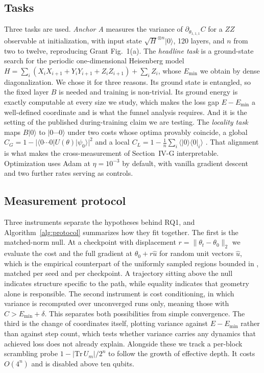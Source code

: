 \documentclass[conference]{IEEEtran}%
\newcommand{\gap}{\ensuremath{E-E_{\min}}}
\begin{document}
\subsection{Tasks}
Three tasks are used. \emph{Anchor A} measures the variance of $\partial_{\theta_{1,1,1}}C$ for a $ZZ$ observable at initialization, with input state $\sqrt{H}^{\otimes n}\lvert0\rangle$, 120 layers, and $n$ from two to twelve, reproducing Grant Fig.~1(a). The \emph{headline task} is a ground-state search for the periodic one-dimensional Heisenberg model $H=\sum_i (X_iX_{i+1}{+}Y_iY_{i+1}{+}Z_iZ_{i+1})+\sum_i Z_i$, whose $E_{\min}$ we obtain by dense diagonalization. We chose it for three reasons. Its ground state is entangled, so the fixed layer $B$ is needed and training is non-trivial. Its ground energy is exactly computable at every size we study, which makes the loss gap \gap{} a well-defined coordinate and is what the funnel analysis requires. And it is the setting of the published during-training claim we are testing. The \emph{locality task} maps $B\lvert0\rangle$ to $\lvert0\cdots0\rangle$ under two costs whose optima provably coincide, a global $C_G=1-\lvert\langle0\cdots0\rvert U(\theta)\lvert\psi_0\rangle\rvert^2$ and a local $C_L=1-\frac1n\sum_i\langle\lvert0\rangle\langle0\rvert_i\rangle$ \cite{cerezo}. That alignment is what makes the cross-measurement of Section~IV-G interpretable. Optimization uses Adam \cite{adam} at $\eta{=}10^{-3}$ by default, with vanilla gradient descent and two further rates serving as controls.

\subsection{Measurement protocol}
Three instruments separate the hypotheses behind RQ1, and Algorithm~\ref{alg:protocol} summarizes how they fit together. The first is the matched-norm null. At a checkpoint with displacement $r=\lVert\theta_t-\theta_0\rVert_2$ we evaluate the cost and the full gradient at $\theta_0+r\hat u$ for random unit vectors $\hat u$, which is the empirical counterpart of the uniformly sampled regions bounded in \cite{puig,mhiri}, matched per seed and per checkpoint. A trajectory sitting above the null indicates structure specific to the path, while equality indicates that geometry alone is responsible. The second instrument is cost conditioning, in which variance is recomputed over unconverged runs only, meaning those with $C>E_{\min}+\delta$. This separates both possibilities from simple convergence. The third is the change of coordinates itself, plotting variance against \gap{} rather than against step count, which tests whether variance carries any dynamics that achieved loss does not already explain. Alongside these we track a per-block scrambling probe $1-\lvert\mathrm{Tr}\,U_m\rvert/2^n$ to follow the growth of effective depth. It costs $O(4^n)$ and is disabled above ten qubits.
\end{document}
